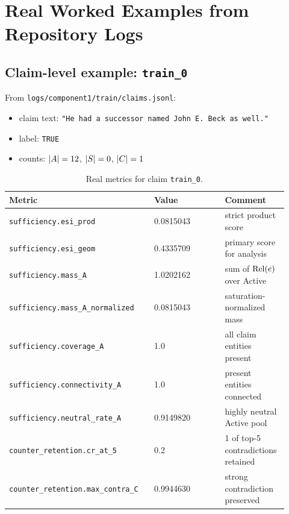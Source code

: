 \section{Real Worked Examples from Repository Logs}
\label{sec:c1_examples}

\subsection{Claim-level example: \texttt{train\_0}}
From \texttt{logs/component1/train/claims.jsonl}:
\begin{itemize}
\item claim text: \texttt{"He had a successor named John E. Beck as well."}
\item label: \texttt{TRUE}
\item counts: $|A|=12$, $|S|=0$, $|C|=1$
\end{itemize}

\begin{table}[H]
\centering
\begin{tabular}{@{}p{0.48\linewidth}p{0.24\linewidth}p{0.20\linewidth}@{}}
\toprule
Metric & Value & Comment \\
\midrule
\texttt{sufficiency.esi\_prod} & 0.0815043 & strict product score \\
\texttt{sufficiency.esi\_geom} & 0.4335709 & primary score for analysis \\
\texttt{sufficiency.mass\_A} & 1.0202162 & sum of $\operatorname{Rel}(e)$ over Active \\
\texttt{sufficiency.mass\_A\_normalized} & 0.0815043 & saturation-normalized mass \\
\texttt{sufficiency.coverage\_A} & 1.0 & all claim entities present \\
\texttt{sufficiency.connectivity\_A} & 1.0 & present entities connected \\
\texttt{sufficiency.neutral\_rate\_A} & 0.9149820 & highly neutral Active pool \\
\texttt{counter\_retention.cr\_at\_5} & 0.2 & 1 of top-5 contradictions retained \\
\texttt{counter\_retention.max\_contra\_C} & 0.9944630 & strong contradiction preserved \\
\bottomrule
\end{tabular}
\caption{Real metrics for claim \texttt{train\_0}.}
\label{tab:c1_train0_metrics}
\end{table}

